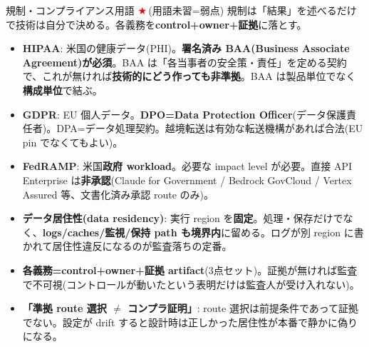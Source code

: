 \documentclass[10pt,a4paper]{article}
\newcommand{\R}[1]{\textcolor{cred}{\textbf{#1}}}
\newcommand{\B}[1]{\textcolor{cblue}{\textbf{#1}}}
\newcommand{\stc}{\textcolor{red}{\ensuremath{\bigstar}}\,}
\begin{document}
\begin{minipage}[t]{0.333\textwidth}

\begin{boxamber}{規制・コンプライアンス用語 \stc (用語未習=弱点)}
規制は「結果」を述べるだけで技術は自分で決める。各義務を\R{control+owner+証拠}に落とす。
\begin{itemize}
\item \R{HIPAA}: 米国の健康データ(PHI)。\B{署名済み BAA(Business Associate Agreement)が必須}。BAA は「各当事者の安全策・責任」を定める契約で、これが無ければ\R{技術的にどう作っても非準拠}。BAA は製品単位でなく\B{構成単位}で結ぶ。
\item \R{GDPR}: EU 個人データ。\B{DPO=Data Protection Officer}(データ保護責任者)。DPA=データ処理契約。越境転送は有効な転送機構があれば合法(EU pin でなくてもよい)。
\item \R{FedRAMP}: 米国\R{政府 workload}。必要な impact level が必要。直接 API Enterprise は\B{非承認}(Claude for Government / Bedrock GovCloud / Vertex Assured 等、文書化済み承認 route のみ)。
\item \R{データ居住性(data residency)}: 実行 region を\B{固定}。処理・保存だけでなく、\B{logs/caches/監視/保持 path も境界内}に留める。ログが別 region に書かれて居住性違反になるのが監査落ちの定番。
\item \R{各義務=control+owner+証拠 artifact}(3点セット)。証拠が無ければ監査で不可視(コントロールが動いたという表明だけは監査人が受け入れない)。
\item \R{「準拠 route 選択 $\neq$ コンプラ証明」}: route 選択は前提条件であって証拠でない。設定が drift すると設計時は正しかった居住性が本番で静かに偽りになる。
\end{itemize}
\end{boxamber}


\end{minipage}
\end{document}

